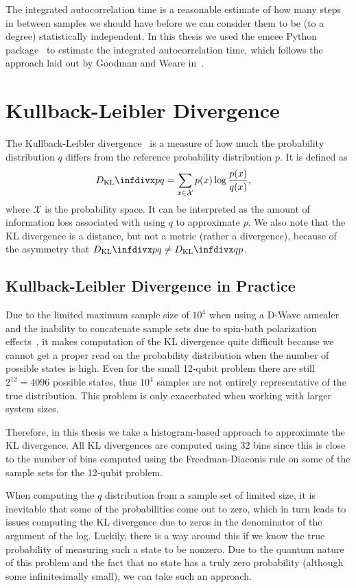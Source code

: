 The integrated autocorrelation time is a reasonable estimate of how many steps in between samples we should have before we can consider them to be (to a degree) statistically independent.
In this thesis we used the emcee Python package~\cite{python_emcee} to estimate the integrated autocorrelation time, which follows the approach laid out by Goodman and Weare in~\cite{goodman_weare_2010}.

\section{Kullback-Leibler Divergence}\label{app:kl_divergence}
The Kullback-Leibler divergence~\cite{kullback_1951} is a measure of how much the probability distribution \( q \) differs from the reference probability distribution \( p \).
It is defined as
\begin{align}
    \DKL{p}{q}
        &= \sum_{x\in\mathcal{X}} p(x) \log\frac{p(x)}{q(x)},
\end{align}
where \( \mathcal{X} \) is the probability space.
It can be interpreted as the amount of information loss associated with using \( q \) to approximate \( p \).
We also note that the KL divergence is a distance, but not a metric (rather a divergence), because of the asymmetry that \( \DKL{p}{q} \ne \DKL{q}{p} \).

\subsection{Kullback-Leibler Divergence in Practice}\label{app:kl_divergence_in_practice}
Due to the limited maximum sample size of \( 10^4 \) when using a D-Wave annealer and the inability to concatenate sample sets due to spin-bath polarization effects~\cite{pochart_2021}, it makes computation of the KL divergence quite difficult because we cannot get a proper read on the probability distribution when the number of possible states is high.
Even for the small 12-qubit problem there are still \( 2^{12} = 4096 \) possible states, thus \( 10^4 \) samples are not entirely representative of the true distribution.
This problem is only exacerbated when working with larger system sizes.

Therefore, in this thesis we take a histogram-based approach to approximate the KL divergence.
All KL divergences are computed using 32 bins since this is close to the number of bins computed using the Freedman-Diaconis rule on some of the sample sets for the 12-qubit problem.

When computing the \( q \) distribution from a sample set of limited size, it is inevitable that some of the probabilities come out to zero, which in turn leads to issues computing the KL divergence due to zeros in the denominator of the argument of the log.
Luckily, there is a way around this if we know the true probability of measuring such a state to be nonzero.
Due to the quantum nature of this problem and the fact that no state has a truly zero probability (although some infinitesimally small), we can take such an approach.

